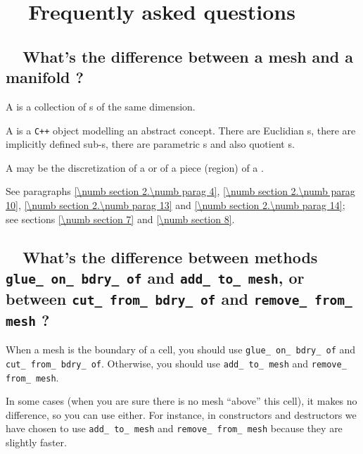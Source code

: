 
\chapter {~~{Frequently asked questions}}\label{\numb section 13}

\section{~~What's the difference between a mesh and a manifold ?}
\label{\numb section 13.\numb parag 1}

A {\small\tt{}} is a collection of {\small\tt{}}s of the
same dimension.

A {\small\tt{}} is a {\tt C++} object modelling an abstract concept.
There are Euclidian {\small\tt{}}s, there are implicitly defined
sub-{\small\tt{}}s, there are parametric {\small\tt{}}s
and also quotient {\small\tt{}}s.

A {\small\tt{}} may be the discretization of a {\small\tt{}}
or of a piece (region) of a {\small\tt{}}.

See paragraphs \ref{\numb section 2.\numb parag 4}, \ref{\numb section 2.\numb parag 10},
\ref{\numb section 2.\numb parag 13} and \ref{\numb section 2.\numb parag 14};
see sections \ref{\numb section 7} and \ref{\numb section 8}.


\section{~~What's the difference between methods {\small\tt glue\_\,on\_\,bdry\_\,of} and
  {\small\tt add\_\,to\_\,mesh}, or between {\small\tt cut\_\,from\_\,bdry\_\,of} and
  {\small\tt remove\_\,from\_\,mesh} ?}
\label{\numb section 13.\numb parag 2}

When a mesh is the boundary of a cell, you should use {\small\tt glue\_\,on\_\,bdry\_\,of} and
{\small\tt cut\_\,from\_\,bdry\_\,of}.
Otherwise, you should use {\small\tt add\_\,to\_\,mesh} and {\small\tt remove\_\,from\_\,mesh}.

In some cases (when you are sure there is no mesh ``above'' this cell), it makes no difference,
so you can use either.
For instance, in {\small\tt{}} constructors and destructors
we have chosen to use {\small\tt add\_\,to\_\,mesh} and {\small\tt remove\_\,from\_\,mesh}
because they are slightly faster.


